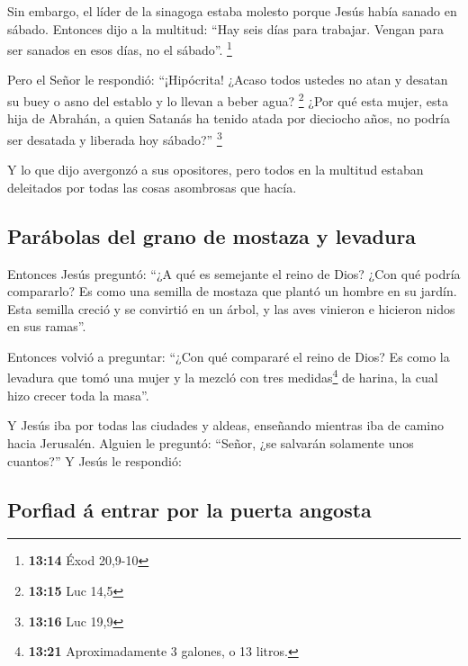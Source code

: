  Sin embargo, el líder de la sinagoga estaba molesto
porque Jesús había sanado en sábado. Entonces dijo a la multitud: ``Hay
seis días para trabajar. Vengan para ser sanados en esos días, no el
sábado''. \footnote{\textbf{13:14} Éxod 20,9-10}

 Pero el Señor le respondió: ``¡Hipócrita! ¿Acaso todos
ustedes no atan y desatan su buey o asno del establo y lo llevan a beber
agua? \footnote{\textbf{13:15} Luc 14,5}  ¿Por qué esta
mujer, esta hija de Abrahán, a quien Satanás ha tenido atada por
dieciocho años, no podría ser desatada y liberada hoy sábado?''
\footnote{\textbf{13:16} Luc 19,9}

 Y lo que dijo avergonzó a sus opositores, pero todos en
la multitud estaban deleitados por todas las cosas asombrosas que hacía.

\hypertarget{paruxe1bolas-del-grano-de-mostaza-y-levadura}{%
\subsection{Parábolas del grano de mostaza y
levadura}\label{paruxe1bolas-del-grano-de-mostaza-y-levadura}}

 Entonces Jesús preguntó: ``¿A qué es semejante el reino
de Dios? ¿Con qué podría compararlo?  Es como una semilla
de mostaza que plantó un hombre en su jardín. Esta semilla creció y se
convirtió en un árbol, y las aves vinieron e hicieron nidos en sus
ramas''.

 Entonces volvió a preguntar: ``¿Con qué compararé el
reino de Dios?  Es como la levadura que tomó una mujer y
la mezcló con tres medidas\footnote{\textbf{13:21} Aproximadamente 3
  galones, o 13 litros.} de harina, la cual hizo crecer toda la masa''.

 Y Jesús iba por todas las ciudades y aldeas, enseñando
mientras iba de camino hacia Jerusalén.  Alguien le
preguntó: ``Señor, ¿se salvarán solamente unos cuantos?'' Y Jesús le
respondió:

\hypertarget{porfiad-uxe1-entrar-por-la-puerta-angosta}{%
\subsection{Porfiad á entrar por la puerta
angosta}\label{porfiad-uxe1-entrar-por-la-puerta-angosta}}

